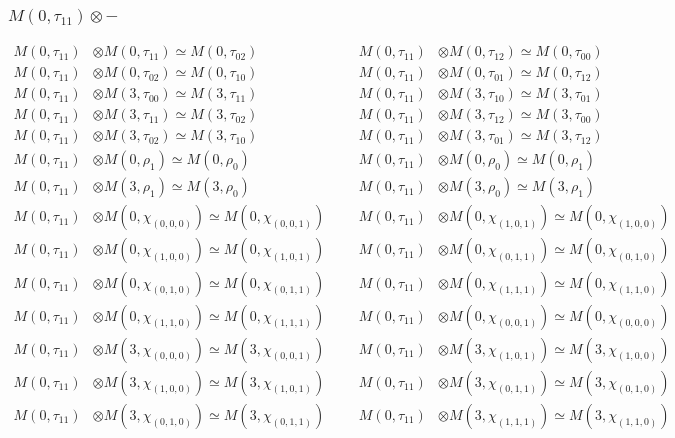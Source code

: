 \subsubsection{$ M(0,\tau_{11})\otimes -$}
\begin{align*}
M(0,\tau_{11}) &\otimes M(0,\tau_{11}) \simeq M(0,\tau_{02}) &&& M(0,\tau_{11}) &\otimes M(0,\tau_{12}) \simeq M(0,\tau_{00})\\
M(0,\tau_{11}) &\otimes M(0,\tau_{02}) \simeq M(0,\tau_{10}) &&& M(0,\tau_{11}) &\otimes M(0,\tau_{01}) \simeq M(0,\tau_{12})\\
M(0,\tau_{11}) &\otimes M(3,\tau_{00}) \simeq M(3,\tau_{11}) &&& M(0,\tau_{11}) &\otimes M(3,\tau_{10}) \simeq M(3,\tau_{01})\\
M(0,\tau_{11}) &\otimes M(3,\tau_{11}) \simeq M(3,\tau_{02}) &&& M(0,\tau_{11}) &\otimes M(3,\tau_{12}) \simeq M(3,\tau_{00})\\
M(0,\tau_{11}) &\otimes M(3,\tau_{02}) \simeq M(3,\tau_{10}) &&& M(0,\tau_{11}) &\otimes M(3,\tau_{01}) \simeq M(3,\tau_{12})\\
M(0,\tau_{11}) &\otimes M(0,\rho_{1}) \simeq M(0,\rho_{0}) &&& M(0,\tau_{11}) &\otimes M(0,\rho_{0}) \simeq M(0,\rho_{1})\\
M(0,\tau_{11}) &\otimes M(3,\rho_{1}) \simeq M(3,\rho_{0}) &&& M(0,\tau_{11}) &\otimes M(3,\rho_{0}) \simeq M(3,\rho_{1})\\
M(0,\tau_{11}) &\otimes M(0,\chi_{(0,0,0)}) \simeq M(0,\chi_{(0,0,1)}) &&& M(0,\tau_{11}) &\otimes M(0,\chi_{(1,0,1)}) \simeq M(0,\chi_{(1,0,0)})\\
M(0,\tau_{11}) &\otimes M(0,\chi_{(1,0,0)}) \simeq M(0,\chi_{(1,0,1)}) &&& M(0,\tau_{11}) &\otimes M(0,\chi_{(0,1,1)}) \simeq M(0,\chi_{(0,1,0)})\\
M(0,\tau_{11}) &\otimes M(0,\chi_{(0,1,0)}) \simeq M(0,\chi_{(0,1,1)}) &&& M(0,\tau_{11}) &\otimes M(0,\chi_{(1,1,1)}) \simeq M(0,\chi_{(1,1,0)})\\
M(0,\tau_{11}) &\otimes M(0,\chi_{(1,1,0)}) \simeq M(0,\chi_{(1,1,1)}) &&& M(0,\tau_{11}) &\otimes M(0,\chi_{(0,0,1)}) \simeq M(0,\chi_{(0,0,0)})\\
M(0,\tau_{11}) &\otimes M(3,\chi_{(0,0,0)}) \simeq M(3,\chi_{(0,0,1)}) &&& M(0,\tau_{11}) &\otimes M(3,\chi_{(1,0,1)}) \simeq M(3,\chi_{(1,0,0)})\\
M(0,\tau_{11}) &\otimes M(3,\chi_{(1,0,0)}) \simeq M(3,\chi_{(1,0,1)}) &&& M(0,\tau_{11}) &\otimes M(3,\chi_{(0,1,1)}) \simeq M(3,\chi_{(0,1,0)})\\
M(0,\tau_{11}) &\otimes M(3,\chi_{(0,1,0)}) \simeq M(3,\chi_{(0,1,1)}) &&& M(0,\tau_{11}) &\otimes M(3,\chi_{(1,1,1)}) \simeq M(3,\chi_{(1,1,0)})\\

\end{align*}
